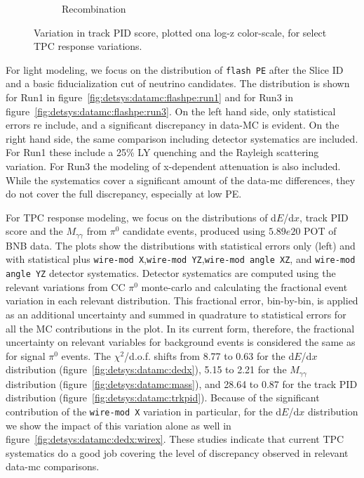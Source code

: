 \documentclass[a4paper]{article}
\newcommand{\dedx}{d$E$/d$x$\xspace}
\begin{document}
\begin{figure}[H]
\begin{center}
\begin{subfigure}[b]{0.35\textwidth}
    \caption{\label{fig:detsys:trkpid:RECOMB}Recombination}
    \end{subfigure}
\caption{\label{fig:detsys:trkpid}Variation in track PID score, plotted ona log-z color-scale, for select TPC response variations.}
\end{center}
\end{figure}


\par For light modeling, we focus on the distribution of \texttt{flash PE} after the Slice ID and a basic fiducialization cut of neutrino candidates. The distribution is shown for Run1 in figure~\ref{fig:detsys:datamc:flashpe:run1} and for Run3 in figure~\ref{fig:detsys:datamc:flashpe:run3}. On the left hand side, only statistical errors re include, and a significant discrepancy in data-MC is evident. On the right hand side, the same comparison including detector systematics are included. For Run1 these include a 25\% LY quenching and the Rayleigh scattering variation. For Run3 the modeling of x-dependent attenuation is also included. While the systematics cover a significant amount of the data-mc differences, they do not cover the full discrepancy, especially at low PE.
\par For TPC response modeling, we focus on the distributions of \dedx, track PID score and the $M_{\gamma\gamma}$ from $\pi^0$ candidate events, produced using $5.89e20$ POT of BNB data. The plots show the distributions with statistical errors only (left) and with statistical plus \texttt{wire-mod X},\texttt{wire-mod YZ},\texttt{wire-mod angle XZ}, and \texttt{wire-mod angle YZ} detector systematics. Detector systematics are computed using the relevant variations from CC $\pi^0$ monte-carlo and calculating the fractional event variation in each relevant distribution. This fractional error, bin-by-bin, is applied as an additional uncertainty and summed in quadrature to statistical errors for all the MC contributions in the plot. In its current form, therefore, the fractional uncertainty on relevant variables for background events is considered the same as for signal $\pi^0$ events. The $\chi^2$/d.o.f. shifts from 8.77 to 0.63 for the \dedx distribution (figure~\ref{fig:detsys:datamc:dedx}), 5.15 to 2.21 for the $M_{\gamma\gamma}$ distribution (figure~\ref{fig:detsys:datamc:mass}), and 28.64 to 0.87 for the track PID distribution (figure~\ref{fig:detsys:datamc:trkpid}). Because of the significant contribution of the \texttt{wire-mod X} variation in particular, for the \dedx distribution we show the impact of this variation alone as well in figure~\ref{fig:detsys:datamc:dedx:wirex}. These studies indicate that current TPC systematics do a good job covering the level of discrepancy observed in relevant data-mc comparisons. 
\end{document}
